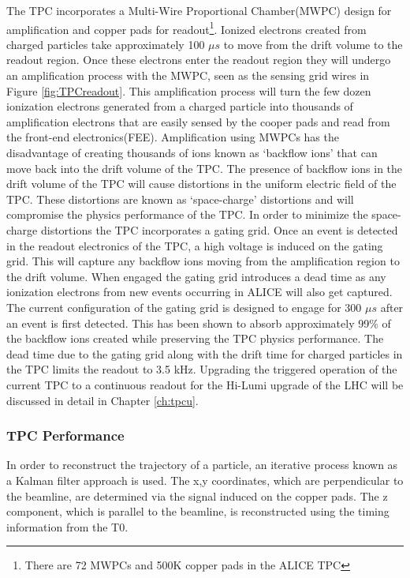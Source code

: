 The TPC incorporates a Multi-Wire Proportional Chamber(MWPC) design for amplification and copper pads for readout\footnote{There are 72 MWPCs and 500K copper pads in the ALICE TPC}. Ionized electrons created from charged particles take approximately 100 $\mu s$ to move from the drift volume to the readout region.  Once these electrons enter the readout region they will undergo an amplification process with the MWPC, seen as the sensing grid wires in Figure \ref{fig:TPCreadout}.  This amplification process will turn the few dozen ionization electrons generated from a charged particle into thousands of amplification electrons that are easily sensed by the cooper pads and read from the front-end electronics(FEE).  Amplification using MWPCs has the disadvantage of creating thousands of ions known as `backflow ions' that can move back into the drift volume of the TPC.  The presence of backflow ions in the drift volume of the TPC will cause distortions in the uniform electric field of the TPC.  These distortions are known as `space-charge' distortions and will compromise the physics performance of the TPC.  In order to minimize the space-charge distortions the TPC incorporates a gating grid\cite{Tangwancharoen:2016dqs}.  Once an event is detected in the readout electronics of the TPC, a high voltage is induced on the gating grid.  This will capture any backflow ions moving from the amplification region to the drift volume.  When engaged the gating grid introduces a dead time as any ionization electrons from new events occurring in ALICE will also get captured.  The current configuration of the gating grid is designed to engage for 300 $\mu s$ after an event is first detected.  This has been shown to absorb approximately 99\% of the backflow ions created while preserving the TPC physics performance.  The dead time due to the gating grid along with the drift time for charged particles in the TPC limits the readout to 3.5 kHz.  Upgrading the triggered operation of the current TPC to a continuous readout for the Hi-Lumi upgrade of the LHC will be discussed in detail in Chapter \ref{ch:tpcu}.

\subsubsection{TPC Performance}\label{sec:tpcper}

In order to reconstruct the trajectory of a particle, an iterative process known as a Kalman filter approach is used.  The x,y coordinates, which are perpendicular to the beamline, are determined via the signal induced on the copper pads.  The z component, which is parallel to the beamline, is reconstructed using the timing information from the T0.  

